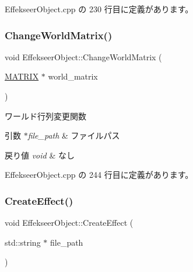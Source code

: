  Effekseer\+Object.\+cpp の 230 行目に定義があります。

\mbox{\label{class_effekseer_object_a7bc76cdd2fb6f4ff38e20ec9c21bdef5}} 
\subsubsection{\texorpdfstring{Change\+World\+Matrix()}{ChangeWorldMatrix()}}
{\footnotesize\ttfamily void Effekseer\+Object\+::\+Change\+World\+Matrix (\begin{DoxyParamCaption}\item[{\mbox{\hyperlink{_matrix_8h_a032295cd9fb1b711757c90667278e744}{M\+A\+T\+R\+IX}} $\ast$}]{world\+\_\+matrix }\end{DoxyParamCaption})\hspace{0.3cm}{\ttfamily [private]}}



ワールド行列変更関数 


\begin{DoxyParams}{引数}
{\em $\ast$file\+\_\+path} & ファイルパス \\
\hline
\end{DoxyParams}

\begin{DoxyRetVals}{戻り値}
{\em void} & なし \\
\hline
\end{DoxyRetVals}


 Effekseer\+Object.\+cpp の 244 行目に定義があります。

\mbox{\label{class_effekseer_object_af55a8edc8ff64371e28fe3e00b6af7ae}} 
\subsubsection{\texorpdfstring{Create\+Effect()}{CreateEffect()}}
{\footnotesize\ttfamily void Effekseer\+Object\+::\+Create\+Effect (\begin{DoxyParamCaption}\item[{std\+::string $\ast$}]{file\+\_\+path }\end{DoxyParamCaption})\hspace{0.3cm}{\ttfamily [private]}}



